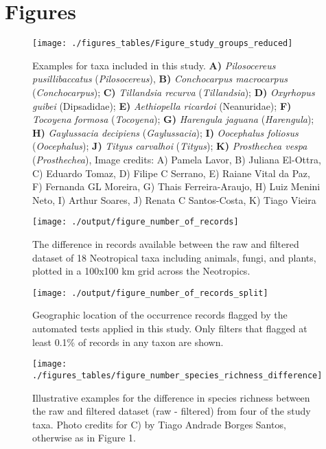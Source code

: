 \documentclass[fleqn,10pt,lineno]{wlpeerj} %
\begin{document}
\hypertarget{figures}{%
\section*{Figures}\label{figures}}

\begin{figure}
\texttt{[image: ./figures\_tables/Figure\_study\_groups\_reduced]} \caption{Examples for taxa included in this study. \textbf{A)} \textit{Pilosocereus pusillibaccatus} (\textit{Pilosocereus}), \textbf{B)} \textit{Conchocarpus macrocarpus} (\textit{Conchocarpus}); \textbf{C)} \textit{Tillandsia recurva} (\textit{Tillandsia}); \textbf{D)} \textit{Oxyrhopus guibei} (Dipsadidae); \textbf{E)} \textit{Aethiopella ricardoi} (Neanuridae); \textbf{F)} \textit{Tocoyena formosa} (\textit{Tocoyena}); \textbf{G)} \textit{Harengula jaguana} (\textit{Harengula}); \textbf{H)} \textit{Gaylussacia decipiens} (\textit{Gaylussacia}); \textbf{I)} \textit{Oocephalus foliosus} (\textit{Oocephalus}); \textbf{J)} \textit{Tityus carvalhoi} (\textit{Tityus}); \textbf{K)} \textit{Prosthechea vespa} (\textit{Prosthechea}), Image credits: A) Pamela Lavor, B) Juliana El-Ottra, C) Eduardo Tomaz, D) Filipe C Serrano, E) Raiane Vital da Paz, F) Fernanda GL Moreira, G) Thais Ferreira-Araujo, H) Luiz Menini Neto, I) Arthur Soares, J) Renata C Santos-Costa, K) Tiago Vieira}\label{fig:species}
\end{figure}

\begin{figure}
\texttt{[image: ./output/figure\_number\_of\_records]} \caption{The difference in records available between the raw and filtered dataset of 18 Neotropical taxa including animals, fungi, and plants, plotted in a 100x100 km grid across the Neotropics.}\label{fig:total}
\end{figure}

\begin{figure}
\texttt{[image: ./output/figure\_number\_of\_records\_split]} \caption{Geographic location of the occurrence records flagged by the automated tests applied in this study. Only filters that flagged at least 0.1\% of records in any taxon are shown.}\label{fig:split}
\end{figure}

\begin{figure}
\texttt{[image: ./figures\_tables/figure\_number\_species\_richness\_difference]} \caption{Illustrative examples for the difference in species richness between the raw and filtered dataset (raw - filtered) from four of the study taxa. Photo credits for C) by Tiago Andrade Borges Santos, otherwise as in Figure 1.}\label{fig:speciesrichness}
\end{figure}
\end{document}
